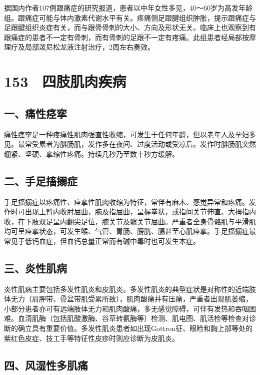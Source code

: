 据国内作者107例跟痛症的研究报道，患者以中年女性多见，40～60岁为高发年龄组。跟痛症可能与体内激素代谢水平有关。疼痛侧足跟腱组织肿胀，提示跟痛症与足跟腱组织炎症有关，而与跟骨骨刺的大小、方向及形状无关。临床上也观察到有跟痛症的患者不一定有骨刺，而有骨刺的足跟不一定有疼痛。此组患者经局部按摩理疗及局部泼尼松龙液注射治疗，2周左右奏效。

\protect\hypertarget{text00344.html}{}{}

\section{153　四肢肌肉疾病}

\subsection{一、痛性痉挛}

痛性痉挛是一种疼痛性肌肉强直性收缩，可发生于任何年龄，但以老年人及孕妇多见。最常受累者为腓肠肌，发作多在夜间、过度活动或受凉后。发作时腓肠肌突然绷紧、坚硬、挛缩性疼痛。持续几秒乃至数十秒方缓解。

\subsection{二、手足搐搦症}

手足搐搦症以疼痛性、痉挛性肌肉收缩为特征，常伴有麻木、感觉异常和疼痛。发作时可出现上臂内收肘屈曲，腕及指屈曲，呈握拳状，或指间关节伸直、大拇指内收，在下肢双足呈内翻尖足位，膝关节及髋关节屈曲。严重者全身骨骼肌与平滑肌均可呈痉挛状态，可发生喉、气管、胃肠、膀胱、膈甚至心肌痉挛。手足搐搦症最常见于低钙血症，但血钙总量正常而有碱中毒时也可发生本症。

\subsection{三、炎性肌病}

炎性肌病主要包括多发性肌炎和皮肌炎。多发性肌炎的典型症状是对称性的近端肢体无力（肩胛带、骨盆带肌受累所致），肌肉酸痛并有压痛，严重者出现肌萎缩，小部分患者亦可有远端肢体无力和肌肉酸痛，多无感觉障碍，可伴有发热和吞咽困难。血清肌酶（包括肌酸激酶、谷草转氨酶等）检测、肌电图、肌活检等检查对诊断的确立具有重要价值。多发性肌炎患者如出现Gottron征、眼睑和胸上部等处的紫红色皮症、技工手等特征性皮疹时则应诊断为皮肌炎。

\subsection{四、风湿性多肌痛}

